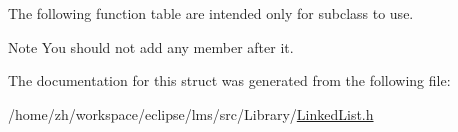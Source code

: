 The following function table are intended only for subclass to use. 

\begin{DoxyNote}{Note}
You should not add any member after it. 
\end{DoxyNote}


The documentation for this struct was generated from the following file\-:\begin{DoxyCompactItemize}
\item 
/home/zh/workspace/eclipse/lms/src/\-Library/\hyperlink{LinkedList_8h}{Linked\-List.\-h}\end{DoxyCompactItemize}
